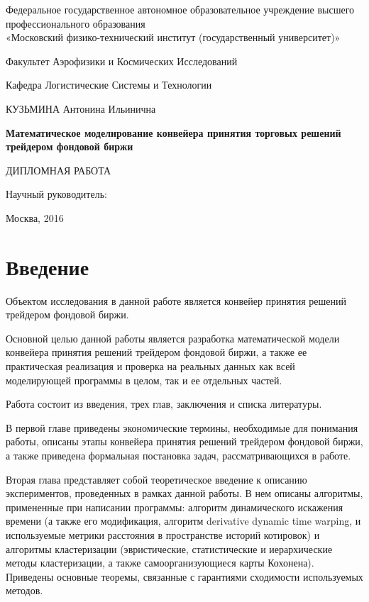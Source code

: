 \documentclass[12pt]{article}
\begin{document}
\thispagestyle{empty}
\begin{center}
\small{Федеральное государственное автономное образовательное учреждение высшего профессионального образования \\ «Московский физико-технический институт (государственный университет)»

Факультет Аэрофизики и Космических Исследований

Кафедра Логистические Системы и Технологии}

\parskip=80pt
КУЗЬМИНА Антонина Ильинична
\parskip=30pt

\textbf{\large{Математическое моделирование конвейера принятия торговых решений трейдером фондовой биржи}}

ДИПЛОМНАЯ РАБОТА
\end{center}

\begin{flushright}
\parskip=50pt
Научный руководитель:
\end{flushright}

\vspace{\fill}
\begin{center}
Москва, 2016
\end{center}
\newpage{}
\tableofcontents{}
\newpage{}
\renewcommand\thesection{}
\renewcommand\thesubsection{}
\renewcommand\thesubsubsection{}
\section{Введение}
Объектом исследования в данной работе является конвейер принятия решений трейдером фондовой биржи.

Основной целью данной работы является разработка математической модели конвейера принятия решений трейдером фондовой биржи, а также ее практическая реализация и проверка на реальных данных как всей моделирующей программы в целом, так и ее отдельных частей.

Работа состоит из введения, трех глав, заключения и списка литературы.

В первой главе приведены экономические термины, необходимые для понимания работы, описаны этапы конвейера принятия решений трейдером фондовой биржи, а также приведена формальная постановка задач, рассматривающихся в работе.

Вторая глава представляет собой теоретическое введение к описанию экспериментов, проведенных в рамках данной работы. В нем описаны алгоритмы, примененные при написании программы: алгоритм динамического искажения времени (а также его модификация, алгоритм derivative dynamic time warping, и используемые метрики расстояния в пространстве историй котировок) и алгоритмы кластеризации (эвристические, статистические и иерархические методы кластеризации, а также самоорганизующиеся карты Кохонена). Приведены основные теоремы, связанные с гарантиями сходимости используемых методов.
\end{document}
